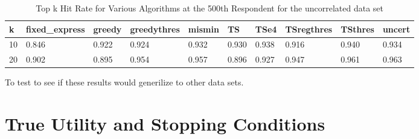 \documentclass[nonblindrev]{informs3}
\begin{document}
\begin{table}
\begin{center}
\begin{tabular}{llllllllll}
\hline   k &  fixed\_express &  greedy &  greedythres &  mismin &    TS &  TSe4 &  TSregthres &  TSthres &  uncert \\\hline    10 & 0.846&0.922&0.924&0.932 & 	0.930&0.938 &   0.916&0.940 &   0.934 \\  20 & 0.902&0.895&0.954& 0.957& 0.896&0.927 & 0.947&0.961 & 0.963 \end{tabular}
\end{center}
\caption{Top k Hit Rate for Various Algorithms at the 500th Respondent for the uncorrelated data set}
\label{table:nice500}
\end{table}
To test to see if these results would generilize to other data sets.

\section{True Utility and Stopping Conditions}
\end{document}
